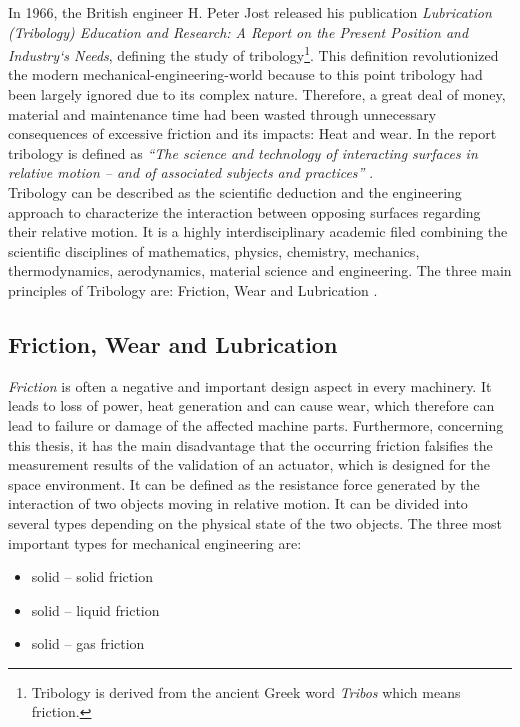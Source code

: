 In 1966, the British engineer H. Peter Jost released his publication \textit{Lubrication (Tribology) Education and Research: A Report on the Present Position and Industry`s Needs}, defining the study of tribology\footnote{Tribology is derived from the ancient Greek word \textit{Tribos} which means friction.}. This definition revolutionized the modern mechanical-engineering-world because to this point tribology had been largely ignored due to its complex nature. Therefore, a great deal of money, material and maintenance time had been wasted through unnecessary consequences of excessive friction and its impacts: Heat and wear.
In the report tribology is defined as \textit{“The science and technology of interacting surfaces in relative motion – and of associated subjects and practices”} \cite{Jost.1990}.\\
Tribology can be described as the scientific deduction and the engineering approach to characterize the interaction between opposing surfaces regarding their relative motion. It is a highly interdisciplinary academic filed combining the scientific disciplines of mathematics, physics, chemistry, mechanics, thermodynamics, aerodynamics, material science and engineering. The three main principles of Tribology are: Friction, Wear and Lubrication \cite{Qiu.2017}.


\subsection{Friction, Wear and Lubrication}
\textit{Friction} is often a negative and important design aspect in every machinery. It leads to loss of power, heat generation and can cause wear, which therefore can lead to failure or damage of the affected machine parts. Furthermore, concerning this thesis, it has the main disadvantage that the occurring friction falsifies the measurement results of the validation of an actuator, which is designed for the space environment.
It can be defined as the resistance force generated by the interaction of two objects moving in relative motion. 
It can be divided into several types depending on the physical state of the two objects. The three most important types for mechanical engineering are:

\newpage 

\begin{itemize}
\setlength{\itemsep}{2pt}
	\item solid – solid friction
	\item solid – liquid friction
	\item solid – gas friction
\end{itemize}

